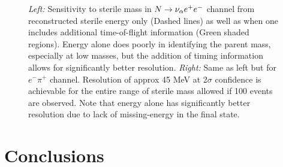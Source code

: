 \documentclass[11pt, a4paper]{article}
\def\ster{\ensuremath N}
\begin{document}
\begin{figure}[t]
\caption{\label{fig:tof_scatter}
	\emph{Left:} Sensitivity to sterile mass in $\ster \rightarrow
\nu_\alpha e^+ e^-$ channel from reconstructed sterile energy only (Dashed
lines) as well as when one includes additional time-of-flight information
(Green shaded regions).  Energy alone does poorly in identifying the parent
mass, especially at low masses, but the addition of timing information allows
for significantly better resolution.  \emph{Right:} Same as left but for $e^-
\pi^+$ channel. Resolution of approx 45 MeV at 2$\sigma$ confidence is
achievable for the entire range of sterile mass allowed if 100 events are
observed. Note that energy alone has significantly better resolution due to
lack of missing-energy in the final state.}
\end{figure}


\section{\label{sec:conclusions}Conclusions}
\end{document}

